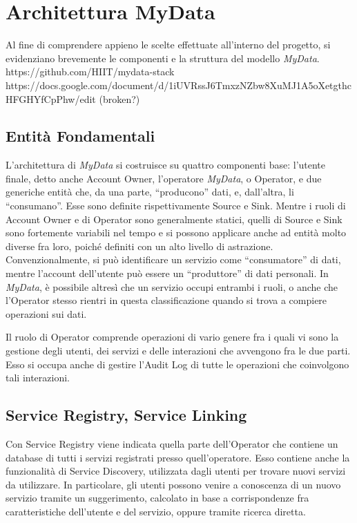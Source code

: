 \chapter{Architettura MyData}
\label{capitolo3}
\thispagestyle{empty}

\noindent Al fine di comprendere appieno le scelte effettuate all’interno del progetto, si evidenziano brevemente le componenti e la struttura del modello \textit{MyData}. https://github.com/HIIT/mydata-stack
https://docs.google.com/document/d/1iUVRssJ6TmxzNZbw8XuMJ1A5oXetgthcHFGHYfCpPhw/edit (broken?)

\section{Entit\`a Fondamentali}
L’architettura di \textit{MyData} si costruisce su quattro componenti base: l’utente finale, detto anche Account Owner, l’operatore \textit{MyData}, o Operator, e due generiche entit\`a che, da una parte, “producono” dati, e, dall’altra, li “consumano”. Esse sono definite rispettivamente Source e Sink. Mentre i ruoli di Account Owner e di Operator sono generalmente statici, quelli di Source e Sink sono fortemente variabili nel tempo e si possono applicare anche ad entit\`a molto diverse fra loro, poich\'e definiti con un alto livello di astrazione. Convenzionalmente, si pu\`o identificare un servizio come “consumatore” di dati, mentre l’account dell’utente pu\`o essere un “produttore” di dati personali. In \textit{MyData}, \`e possibile altres\`i che un servizio occupi entrambi i ruoli, o anche che l’Operator stesso rientri in questa classificazione quando si trova a compiere operazioni sui dati.

Il ruolo di Operator comprende operazioni di vario genere fra i quali vi sono la gestione degli utenti, dei servizi e delle interazioni che avvengono fra le due parti. Esso si occupa anche di gestire l’Audit Log di tutte le operazioni che coinvolgono tali interazioni.

\section{Service Registry, Service Linking}
Con Service Registry viene indicata quella parte dell’Operator che contiene un database di tutti i servizi registrati presso quell’operatore. Esso contiene anche la funzionalit\`a di Service Discovery, utilizzata dagli utenti per trovare nuovi servizi da utilizzare. In particolare, gli utenti possono venire a conoscenza di un nuovo servizio tramite un suggerimento, calcolato in base a corrispondenze fra caratteristiche dell’utente e del servizio, oppure tramite ricerca diretta.

